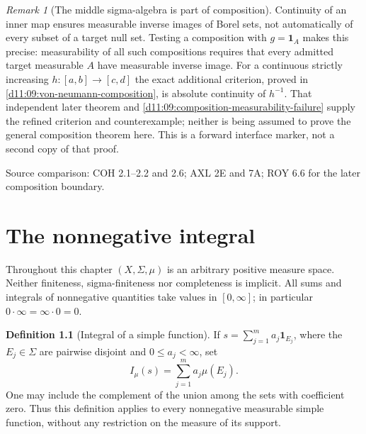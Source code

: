 \documentclass[11pt,oneside,openany]{book}
\theoremstyle{definition}
\newtheorem{definition}[theorem]{Definition}
\theoremstyle{remark}
\newtheorem{remark}[theorem]{Remark}
\newcommand{\one}{\mathbf1}\newcommand{\ind}[1]{\mathbf1_{#1}}
\newcommand{\Eplus}{[0,\infty]}
\newcommand{\family}[1]{}
\newcommand{\source}[1]{\par\begingroup\small\sffamily\color{black!65}Source comparison: #1\par\endgroup}
\begin{document}
\begin{remark}[The middle sigma-algebra is part of composition]
\family{D11.04.lebesgue_composition_boundary}\label{d11:04:lebesgue-composition-boundary}
Continuity of an inner map ensures measurable inverse images of Borel sets,
not automatically of every subset of a target null set. Testing a composition
with $g=\one_A$ makes this precise: measurability of all such compositions
requires that every admitted target measurable $A$ have measurable inverse
image. For a continuous strictly increasing $h:[a,b]\to[c,d]$ the exact
additional criterion, proved in \cref{d11:09:von-neumann-composition}, is
absolute continuity of $h^{-1}$. That independent later theorem and
\cref{d11:09:composition-measurability-failure} supply the refined criterion
and counterexample; neither is being assumed to prove the general composition
theorem here. This is a forward interface marker, not a second copy of that proof.
\end{remark}
\source{COH 2.1--2.2 and 2.6; AXL 2E and 7A; ROY 6.6 for the later composition boundary.}



\chapter{The nonnegative integral}\label{ch:d11-05}
Throughout this chapter $(X,\Sigma,\mu)$ is an arbitrary positive measure
space. Neither finiteness, sigma-finiteness nor completeness is implicit.
All sums and integrals of nonnegative quantities take values in $\Eplus$;
in particular $0\cdot\infty=\infty\cdot0=0$.

\begin{definition}[Integral of a simple function]
\family{D11.05.simple_integral}\label{d11:05:simple-integral}
If $s=\sum_{j=1}^m a_j\one_{E_j}$, where the $E_j\in\Sigma$ are pairwise
disjoint and $0\leq a_j<\infty$, set
\[
 I_\mu(s)=\sum_{j=1}^m a_j\mu(E_j).
\]
One may include the complement of the union among the sets with coefficient
zero. Thus this definition applies to every nonnegative measurable simple
function, without any restriction on the measure of its support.
\end{definition}
\end{document}
